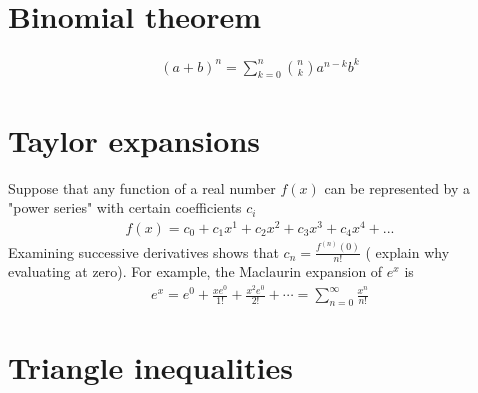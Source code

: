 \section{Binomial theorem}
\begin{align*}
  (a + b)^n = \sum_{k=0}^n{n \choose k}a^{n-k}b^k
\end{align*}

\section{Taylor expansions}

Suppose that any function of a real number $f(x)$ can be represented by a "power series" with certain coefficients $c_i$
\begin{align*}
  f(x) = c_0 + c_1x^1 + c_2x^2 + c_3x^3 + c_4x^4 + ...
\end{align*}
Examining successive derivatives shows that $c_n = \frac{f^{(n)}(0)}{n!}$ ( explain why evaluating at zero).
For example, the Maclaurin expansion of $e^{x}$ is
\begin{align*}
  e^x = e^{0} + \frac{xe^0}{1!} + \frac{x^2e^0}{2!} + \cdots = \sum_{n=0}^\infty \frac{x^n}{n!}
\end{align*}

\section{Triangle inequalities}

